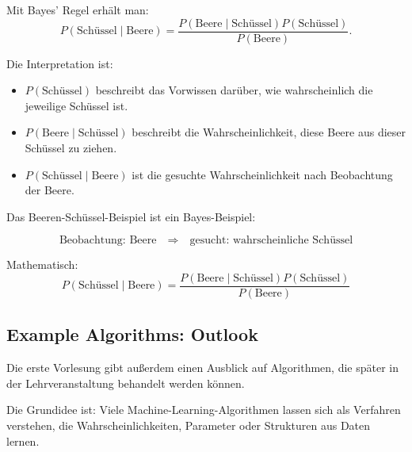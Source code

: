 \documentclass[11pt,a4paper]{scrartcl}
\begin{document}
\begin{calculationbox}
    Mit Bayes' Regel erhält man:
    \[
        P(\text{Schüssel} \mid \text{Beere})
        =
        \frac{
            P(\text{Beere} \mid \text{Schüssel})
            P(\text{Schüssel})
        }{
            P(\text{Beere})
        }.
    \]

    Die Interpretation ist:
    \begin{itemize}
        \item \(P(\text{Schüssel})\) beschreibt das Vorwissen darüber, wie
        wahrscheinlich die jeweilige Schüssel ist.
        \item \(P(\text{Beere} \mid \text{Schüssel})\) beschreibt die
        Wahrscheinlichkeit, diese Beere aus dieser Schüssel zu ziehen.
        \item \(P(\text{Schüssel} \mid \text{Beere})\) ist die gesuchte
        Wahrscheinlichkeit nach Beobachtung der Beere.
    \end{itemize}
\end{calculationbox}

\begin{answerbox}
    Das Beeren-Schüssel-Beispiel ist ein Bayes-Beispiel:

    \[
        \boxed{
            \text{Beobachtung: Beere}
            \quad \Longrightarrow \quad
            \text{gesucht: wahrscheinliche Schüssel}
        }
    \]

    Mathematisch:
    \[
        \boxed{
            P(\text{Schüssel} \mid \text{Beere})
            =
            \frac{
                P(\text{Beere} \mid \text{Schüssel})
                P(\text{Schüssel})
            }{
                P(\text{Beere})
            }
        }
    \]
\end{answerbox}

\subsection{Example Algorithms: Outlook}

\begin{notebox}
    Die erste Vorlesung gibt außerdem einen Ausblick auf Algorithmen, die später
    in der Lehrveranstaltung behandelt werden können.

    Die Grundidee ist: Viele Machine-Learning-Algorithmen lassen sich als
    Verfahren verstehen, die Wahrscheinlichkeiten, Parameter oder Strukturen aus
    Daten lernen.
\end{notebox}
\end{document}
